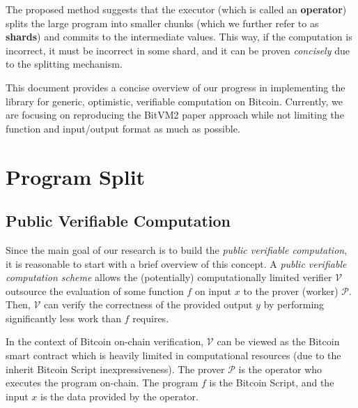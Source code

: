 \documentclass{iacrtrans}
\begin{document}
The proposed method suggests that the executor (which is called an \textbf{operator}) splits the large program into smaller chunks (which we further refer to as \textbf{shards}) and commits to the intermediate values. This way, if the computation is incorrect, it must be incorrect in some shard, and it can be proven \textit{concisely} due to the splitting mechanism.

This document provides a concise overview of our progress in implementing the library for generic, optimistic, verifiable computation on Bitcoin. Currently, we are focusing on reproducing the BitVM2 paper approach while not limiting the function and input/output format as much as possible.

\section{Program Split}\label{sec:program-splitting}

\subsection{Public Verifiable Computation}

Since the main goal of our research is to build the \textit{public verifiable computation}, it is reasonable to start with a brief overview of this concept. A \textit{public verifiable computation scheme} allows the (potentially) computationally limited verifier $\mathcal{V}$ outsource the evaluation of some function $f$ on input $x$ to the prover (worker) $\mathcal{P}$. Then, $\mathcal{V}$ can verify the correctness of the provided output $y$ by performing significantly less work than $f$ requires. 

In the context of Bitcoin on-chain verification, $\mathcal{V}$ can be viewed as the Bitcoin smart contract which is heavily limited in computational resources (due to the inherit Bitcoin Script inexpressiveness). The prover $\mathcal{P}$ is the operator who executes the program on-chain. The program $f$ is the Bitcoin Script, and the input $x$ is the data provided by the operator. 
\end{document}
